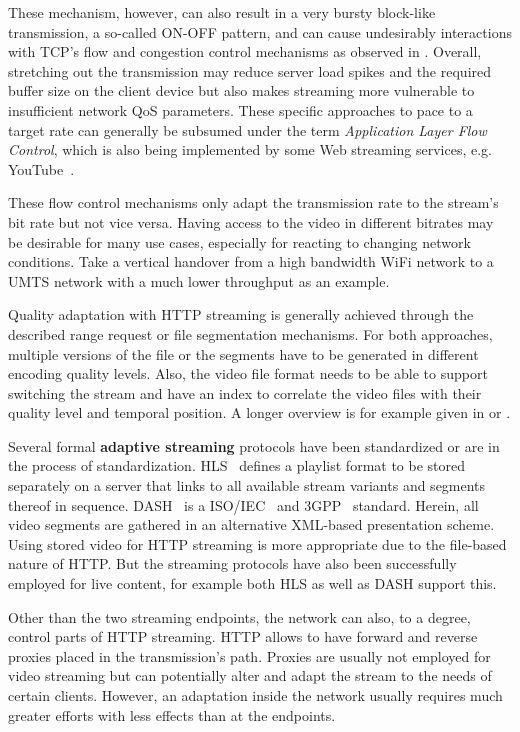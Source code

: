 These mechanism, however, can also result in a very bursty block-like transmission, a so-called ON-OFF pattern, and can cause undesirably interactions with \gls{TCP}'s flow and congestion control mechanisms as observed in \cite{alcock2011afcyt}. Overall, stretching out the transmission may reduce server load spikes and the required buffer size on the client device but also makes streaming more vulnerable to insufficient network \gls{QoS} parameters. These specific approaches to pace to a target rate can generally be subsumed under the term \textit{Application Layer Flow Control}, which is also being implemented by some Web streaming services, e.g. YouTube~\cite{metzger2011delivery}.

These flow control mechanisms only adapt the transmission rate to the stream's bit rate but not vice versa. Having access to the video in different bitrates may be desirable for many use cases, especially for reacting to changing network conditions. Take a vertical handover from a high bandwidth WiFi network to a \gls{UMTS} network with a much lower throughput as an example. 

Quality adaptation with \gls{HTTP} streaming is generally achieved through the described range request or file segmentation mechanisms. For both approaches, multiple versions of the file or the segments have to be generated in different encoding quality levels. Also, the video file format needs to be able to support switching the stream and have an index to correlate the video files with their quality level and temporal position. A longer overview is for example given in \cite{ma2011mobile} or \cite{watching-video1}.

Several formal \textbf{adaptive streaming} protocols have been standardized or are in the process of standardization. \gls{HLS}~\cite{pantos2011livestreaming} defines a playlist format to be stored separately on a server that links to all available stream variants and segments thereof in sequence. \gls{DASH}~\cite{Stockhammer:2011:DAS:1943552.1943572} is a \acrshort{ISO}/\acrshort{IEC}~\cite{iso-iec-23009-1} and \acrshort{3GPP}~\cite{3gpp.26.247} standard. Herein, all video segments are gathered in an alternative \acrshort{XML}-based presentation scheme. Using stored video for \gls{HTTP} streaming is more appropriate due to the file-based nature of \gls{HTTP}. But the streaming protocols have also been successfully employed for live content, for example both \gls{HLS} as well as \gls{DASH} support this.

Other than the two streaming endpoints, the network can also, to a degree, control parts of \gls{HTTP} streaming. \gls{HTTP} allows to have forward and reverse proxies placed in the transmission's path. Proxies are usually not employed for video streaming but can potentially alter and adapt the stream to the needs of certain clients. However, an adaptation inside the network usually requires much greater efforts with less effects than at the endpoints.

